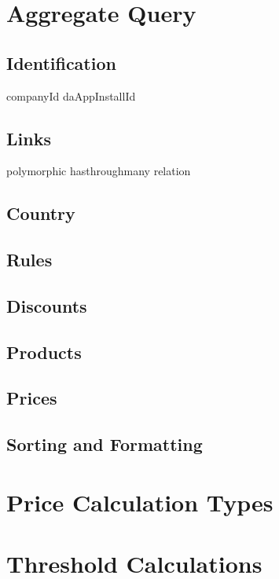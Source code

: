 \section{Aggregate Query}
\subsection{Identification}
companyId daAppInstallId
\subsection{Links}
polymorphic hasthroughmany relation
\subsection{Country}
\subsection{Rules}
\subsection{Discounts}
\subsection{Products}
\subsection{Prices}
\subsection{Sorting and Formatting}


%
\section{Price Calculation Types}

%
\section{Threshold Calculations}

